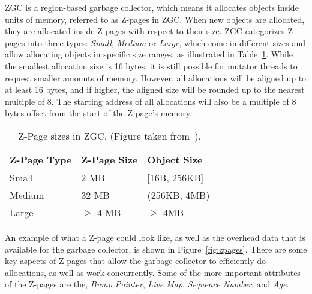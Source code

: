 ZGC is a region-based garbage collector, which means it allocates objects inside units of memory, referred to as Z-pages in ZGC. When new objects are allocated, they are allocated inside Z-pages with respect to their size. ZGC categorizes Z-pages into three types: \textit{Small}, \textit{Medium} or \textit{Large}, which come in different sizes and allow allocating objects in specific size ranges, as illustrated in Table~\ref{table:zpage_sizes}. While the smallest allocation size is 16 bytes, it is still possible for mutator threads to request smaller amounts of memory. However, all allocations will be aligned up to at least 16 bytes, and if higher, the aligned size will be rounded up to the nearest multiple of 8. The starting address of all allocations will also be a multiple of 8 bytes offset from the start of the Z-page's memory.

\begin{table}[H]
    \centering
    \begin{tabular}{lllll}
        \hline
        Z-Page Type & Z-Page Size          & \multicolumn{3}{l}{Object Size}        \\ \hline
        Small     & 2 MB                & \multicolumn{3}{l}{{[}16B, 256KB{]}}   \\
        Medium    & 32 MB               & \multicolumn{3}{l}{(256KB, 4MB)}       \\
        Large     & $\geq$ 4 MB & \multicolumn{3}{l}{$\geq$ 4MB} \\ \hline
    \end{tabular}
    \caption{Z-Page sizes in ZGC. (Figure taken from~\cite{zpage_size_table}). }
    \label{table:zpage_sizes}
\end{table}

An example of what a Z-page could look like, as well as the overhead data that is available for the garbage collector, is shown in Figure~\ref{fig:zpages}. There are some key aspects of Z-pages that allow the garbage collector to efficiently do allocations, as well as work concurrently. Some of the more important attributes of the Z-pages are the, \textit{Bump Pointer}, \textit{Live Map}, \textit{Sequence Number}, and \textit{Age}.

